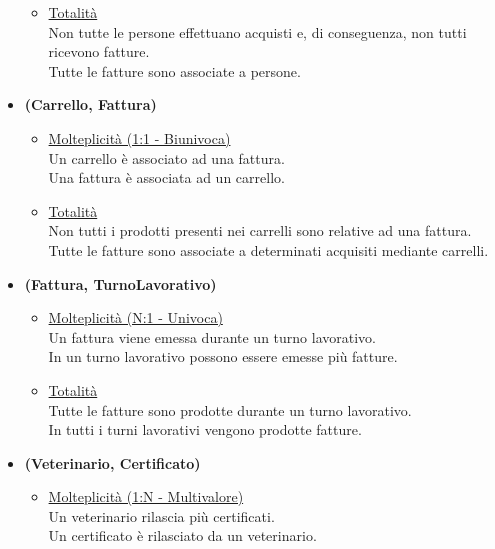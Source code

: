 \documentclass[12pt]{report}
\begin{document}
\begin{itemize}
\begin{itemize}
		\item \underline{Totalità} \\ [2mm]
		    Non tutte le persone effettuano acquisti e, di conseguenza, non tutti ricevono fatture.\\
            Tutte le fatture sono associate a persone.\\
	\end{itemize}
	
\newpage
	
\item \textbf{(Carrello, Fattura)} 
	\begin{itemize}
		\item \underline{Molteplicità (1:1 - Biunivoca) } \\ [2mm]
	    	Un carrello è associato ad una fattura.\\
            Una fattura è associata ad un carrello.\\

		\item \underline{Totalità} \\ [2mm]
		    Non tutti i prodotti presenti nei carrelli sono relative ad una fattura.\\
            Tutte le fatture sono associate a determinati acquisiti mediante carrelli.\\
	\end{itemize}

\item \textbf{(Fattura, TurnoLavorativo)} 
	\begin{itemize}
		\item \underline{Molteplicità (N:1 - Univoca) } \\ [2mm]
	    	Un fattura viene emessa durante un turno lavorativo.\\
            In un turno lavorativo possono essere emesse più fatture.\\

		\item \underline{Totalità} \\ [2mm]
		    Tutte le fatture sono prodotte durante un turno lavorativo.\\
            In tutti i turni lavorativi vengono prodotte fatture.\\
	\end{itemize}

\item \textbf{(Veterinario, Certificato)}
	\begin{itemize}
		\item \underline{Molteplicità (1:N - Multivalore)} \\ [2mm]
		Un veterinario rilascia più certificati. \\
        Un certificato è rilasciato da un veterinario. \\


\end{itemize}
\end{itemize}
\end{document}
